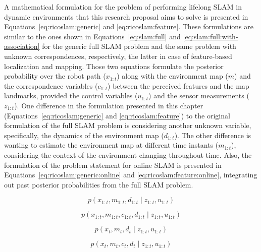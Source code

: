 A mathematical formulation for the problem of performing lifelong \gls{SLAM} in dynamic environments that this research proposal aims to solve is presented in Equations~\ref{eq:ricoslam:generic} and \ref{eq:ricoslam:feature}.
These formulations are similar to the ones shown in Equations~\ref{eq:slam:full} and \ref{eq:slam:full:with-association} for the generic full \gls{SLAM} problem and the same problem with unknown correspondences, respectively, the latter in case of feature-based localization and mapping.
Those two equations formulate the posterior probability over the robot path ($x_{1:t}$) along with the environment map ($m$) and the correspondence variables ($c_{1:t}$) between the perceived features and the map landmarks, provided the control variables ($u_{1:t}$) and the sensor measurements ($z_{1:t}$).
One difference in the formulation presented in this chapter (Equations~\ref{eq:ricoslam:generic} and \ref{eq:ricoslam:feature}) to the original formulation of the full \gls{SLAM} problem is considering another unknown variable, specifically, the dynamics of the environment map ($d_{1:t}$).
The other difference is wanting to estimate the environment map at different time instants ($m_{1:t}$), considering the context of the environment changing throughout time.
Also, the formulation of the problem statement for online \gls{SLAM} is presented in Equations~\ref{eq:ricoslam:generic:online} and \ref{eq:ricoslam:feature:online}, integrating out past posterior probabilities from the full \gls{SLAM} problem.

\begin{equation}\label{eq:ricoslam:generic}
p\left(x_{1:t},m_{1:t},d_{1:t} \;\vert\; z_{1:t},u_{1:t}\right)
\end{equation}

\begin{equation}\label{eq:ricoslam:feature}
p\left(x_{1:t},m_{1:t},c_{1:t},d_{1:t} \;\vert\; z_{1:t},u_{1:t}\right)
\end{equation}

\begin{equation}\label{eq:ricoslam:generic:online}
p\left(x_{t},m_{t},d_{t} \;\vert\; z_{1:t},u_{1:t}\right)
\end{equation}

\begin{equation}\label{eq:ricoslam:feature:online}
p\left(x_{t},m_{t},c_{t},d_{t} \;\vert\; z_{1:t},u_{1:t}\right)
\end{equation}






